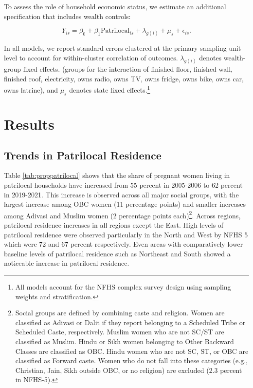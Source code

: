 \documentclass[12pt]{article}
\begin{document}
To assess the role of household economic status, we estimate an additional specification that includes wealth controls:

\begin{equation} \label{eq:controls}
Y_{is} = \beta_0 + \beta_1 \text{Patrilocal}_{is} + \lambda_ {g(i)} + \mu_s + \epsilon_{is}.
\end{equation}

In all models, we report standard errors clustered at the primary sampling unit level to account for within-cluster correlation of outcomes.  $\lambda_{g(i)}$ denotes wealth-group fixed effects. (groups for the interaction of finished floor, finished wall, finished roof, electricity, owns radio, owns TV, owns fridge, owns bike, owns car, owns latrine), and $\mu_s$ denotes state fixed effects.\footnote{All models account for the NFHS complex survey design using sampling weights and stratification.}



\section{Results}
\subsection{Trends in Patrilocal Residence}

Table \ref{tab:proppatrilocal} shows that the share of pregnant women living in patrilocal households have increased from 55 percent in 2005-2006 to 62 percent in 2019-2021. This increase is observed across all major social groups, with the largest increase among OBC women (11 percentage points) and smaller increases among Adivasi and Muslim women (2 percentage points each)\footnote{Social groups are defined by combining caste and religion. Women are classified as Adivasi or Dalit if they report belonging to a Scheduled Tribe or Scheduled Caste, respectively. Muslim women who are not SC/ST are classified as Muslim. Hindu or Sikh women belonging to Other Backward Classes are classified as OBC. Hindu women who are not SC, ST, or OBC are classified as Forward caste. Women who do not fall into these categories (e.g., Christian, Jain, Sikh outside OBC, or no religion) are excluded (2.3 percent in NFHS-5).}.  Across regions, patrilocal residence increases in all regions except the East. High levels of patrilocal residence were observed particularly in the North and West by NFHS 5 which were 72 and 67 percent respectively. Even areas with comparatively lower baseline levels of patrilocal residence such as Northeast and South showed a noticeable increase in patrilocal residence.  
\end{document}
